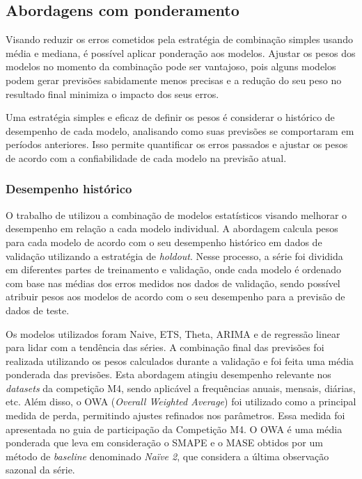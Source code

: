 \subsection{Abordagens com ponderamento}

Visando reduzir os erros cometidos pela estratégia de combinação simples usando média e mediana, é possível aplicar ponderação aos modelos. Ajustar os pesos dos modelos no momento da combinação pode ser vantajoso, pois alguns modelos podem gerar previsões sabidamente menos precisas e a redução do seu peso no resultado final minimiza o impacto dos seus erros.

Uma estratégia simples e eficaz de definir os pesos é considerar o histórico de desempenho de cada modelo, analisando como suas previsões se comportaram em períodos anteriores. Isso permite quantificar os erros passados e ajustar os pesos de acordo com a confiabilidade de cada modelo na previsão atual.

\subsubsection{Desempenho histórico}

O trabalho de \cite{pawlikowski} utilizou a combinação de modelos estatísticos visando melhorar o desempenho em relação a cada modelo individual. A abordagem calcula pesos para cada modelo de acordo com o seu desempenho histórico em dados de validação utilizando a estratégia de \textit{holdout}. Nesse processo, a série foi dividida em diferentes partes de treinamento e validação, onde cada modelo é ordenado com base nas médias dos erros medidos nos dados de validação, sendo possível atribuir pesos aos modelos de acordo com o seu desempenho para a previsão de dados de teste.

Os modelos utilizados foram Naive, ETS, Theta, ARIMA e de regressão linear para lidar com a tendência das séries. A combinação final das previsões foi realizada utilizando os pesos calculados durante a validação e foi feita uma média ponderada das previsões. Esta abordagem atingiu desempenho relevante nos \textit{datasets} da competição M4, sendo aplicável a frequências anuais, mensais, diárias, etc. Além disso, o OWA (\textit{Overall Weighted Average}) foi utilizado como a principal medida de perda, permitindo ajustes refinados nos parâmetros. Essa medida foi apresentada no guia de participação da Competição M4. O OWA é uma média ponderada que leva em consideração o SMAPE e o MASE obtidos por um método de \textit{baseline} denominado \textit{Naïve 2}, que considera a última observação sazonal da série. 

